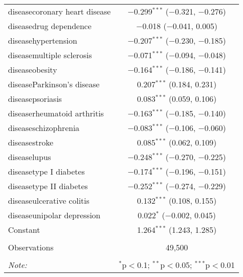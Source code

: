 \begin{table}[!htbp]
\begin{tabular}{@{\extracolsep{5pt}}lc}
  diseasecoronary heart disease & $-$0.299$^{***}$ ($-$0.321, $-$0.276) \\ 
  diseasedrug dependence & $-$0.018 ($-$0.041, 0.005) \\ 
  diseasehypertension & $-$0.207$^{***}$ ($-$0.230, $-$0.185) \\ 
  diseasemultiple sclerosis & $-$0.071$^{***}$ ($-$0.094, $-$0.048) \\ 
  diseaseobesity & $-$0.164$^{***}$ ($-$0.186, $-$0.141) \\ 
  diseaseParkinson's disease & 0.207$^{***}$ (0.184, 0.231) \\ 
  diseasepsoriasis & 0.083$^{***}$ (0.059, 0.106) \\ 
  diseaserheumatoid arthritis & $-$0.163$^{***}$ ($-$0.185, $-$0.140) \\ 
  diseaseschizophrenia & $-$0.083$^{***}$ ($-$0.106, $-$0.060) \\ 
  diseasestroke & 0.085$^{***}$ (0.062, 0.109) \\ 
  diseaselupus & $-$0.248$^{***}$ ($-$0.270, $-$0.225) \\ 
  diseasetype I diabetes & $-$0.174$^{***}$ ($-$0.196, $-$0.151) \\ 
  diseasetype II diabetes & $-$0.252$^{***}$ ($-$0.274, $-$0.229) \\ 
  diseaseulcerative colitis & 0.132$^{***}$ (0.108, 0.155) \\ 
  diseaseunipolar depression & 0.022$^{*}$ ($-$0.002, 0.045) \\ 
  Constant & 1.264$^{***}$ (1.243, 1.285) \\ 
 \hline \\[-1.8ex] 
Observations & 49,500 \\ 
\hline 
\hline \\[-1.8ex] 
\textit{Note:}  & \multicolumn{1}{r}{$^{*}$p$<$0.1; $^{**}$p$<$0.05; $^{***}$p$<$0.01} \\ 
\end{tabular} 
\end{table} 

